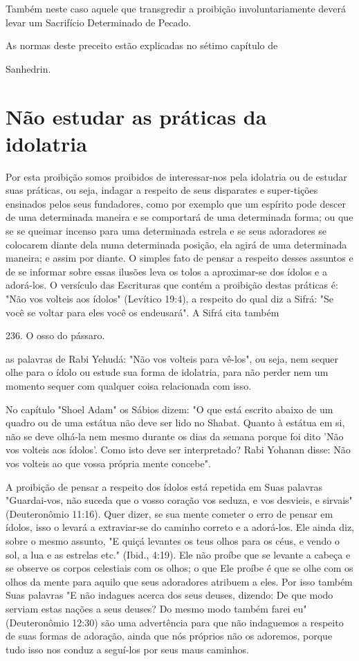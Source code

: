 \begin{itemize}
\begin{enumrate}
\begin{itemize}
\begin{itemize}
\begin{itemize}
Também neste caso aquele que transgredir a proibição involuntaria­mente
deverá levar um Sacrifício Determinado de Pecado.


As normas deste preceito estão explicadas no sétimo capítulo de


Sanhedrin.

\section{Não estudar as práticas da idolatria}

Por esta proibição somos proibidos de interessar-nos pela idolatria ou
de estudar suas práticas, ou seja, indagar a respeito de seus disparates
e super-tições ensinados pelos seus fundadores, como por exemplo que um
espírito po­de descer de uma determinada maneira e se comportará de uma
determinada forma; ou que se se queimar incenso para uma determinada
estrela e se seus ado­radores se colocarem diante dela numa determinada
posição, ela agirá de uma determinada maneira; e assim por diante. O
simples fato de pensar a respeito desses assuntos e de se informar sobre
essas ilusões leva os tolos a aproximar-se dos ídolos e a adorá-los. O
versículo das Escrituras que contém a proibição des­tas práticas é: "Não
vos volteis aos ídolos" (Levítico 19:4), a respeito do qual diz a Sifrá:
"Se você se voltar para eles você os endeusará". A Sifrá cita também

236. O osso do pássaro.

as palavras de Rabi Yehudá: "Não vos volteis para vê-los", ou seja, nem
sequer olhe para o ídolo ou estude sua forma de idolatria, para não
perder nem um momento sequer com qualquer coisa relacionada com isso.

No capítulo "Shoel Adam" os Sábios dizem: "O que está escrito abai­xo de
um quadro ou de uma estátua não deve ser lido no Shabat. Quanto à
estátua em si, não se deve olhá-la nem mesmo durante os dias da semana
por­que foi dito 'Não vos volteis aos ídolos'. Como isto deve ser
interpretado? Rabi Yohanan disse: Não vos volteis ao que vossa própria
mente concebe".

A proibição de pensar a respeito dos ídolos está repetida em Suas
pa­lavras "Guardai-vos, não suceda que o vosso coração vos seduza, e vos
desvieis, e sirvais" (Deuteronômio 11:16). Quer dizer, se sua mente
cometer o erro de pen­sar em ídolos, isso o levará a extraviar-se do
caminho correto e a adorá-los. Ele ainda diz, sobre o mesmo assunto, "E
quiçá levantes os teus olhos para os céus, e vendo o sol, a lua e as
estrelas etc." (Ibid., 4:19). Ele não proíbe que se levante a cabeça e
se observe os corpos celestiais com os olhos; o que Ele proíbe é que se
olhe com os olhos da mente para aquilo que seus adoradores atribuem a
eles. Por isso também Suas palavras "E não indagues acerca dos seus
deuses, dizendo: De que modo serviam estas nações a seus deuses? Do
mesmo modo também fa­rei eu" (Deuteronômio 12:30) são uma advertência
para que não indaguemos a respeito de suas formas de adoração, ainda que
nós próprios não os adoremos, porque tudo isso nos conduz a seguí-los
por seus maus caminhos.


\end{itemize}
\end{itemize}
\end{itemize}
\end{enumrate}
\end{itemize}
